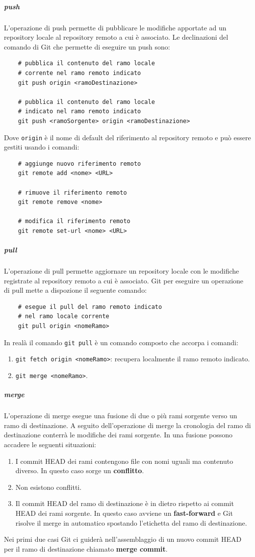 \subparagraph{push}
\label{subpar:push}
L'operazione di push permette di pubblicare le modifiche apportate ad un repository locale al repository remoto a cui è associato.
Le declinazioni del comando di Git che permette di eseguire un push sono:
\begin{lstlisting}
    # pubblica il contenuto del ramo locale 
    # corrente nel ramo remoto indicato
    git push origin <ramoDestinazione> 

    # pubblica il contenuto del ramo locale
    # indicato nel ramo remoto indicato
    git push <ramoSorgente> origin <ramoDestinazione>
\end{lstlisting}   
Dove \texttt{origin} è il nome di default del riferimento al repository remoto e può essere gestiti usando i comandi:
\begin{lstlisting}
    # aggiunge nuovo riferimento remoto
    git remote add <nome> <URL>

    # rimuove il riferimento remoto
    git remote remove <nome>

    # modifica il riferimento remoto
    git remote set-url <nome> <URL>
\end{lstlisting}

\subparagraph{pull}
\label{subpar:pull}
L'operazione di pull permette aggiornare un repository locale con le modifiche registrate al repository remoto a cui è associato.
Git per eseguire un operazione di pull mette a dispozione il seguente comando:
\begin{lstlisting}
    # esegue il pull del ramo remoto indicato
    # nel ramo locale corrente
    git pull origin <nomeRamo>
\end{lstlisting}
In realà il comando \lstinline|git pull| è un comando composto che accorpa i comandi:
\begin{enumerate}
    \item \lstinline|git fetch origin <nomeRamo>|: recupera localmente il ramo remoto indicato.
    \item \lstinline|git merge <nomeRamo>|.
\end{enumerate}

\subparagraph{merge}
\label{subpar:merge}
L'operazione di merge esegue una fusione di due o più rami sorgente verso un ramo di destinazione.
A seguito dell'operazione di merge la cronologia del ramo di destinazione conterrà le modifiche dei rami sorgente.
In una fusione possono accadere le seguenti situazioni:
\begin{enumerate}
    \item I commit HEAD dei rami contengono file con nomi uguali ma contenuto diverso.
    In questo caso sorge un \textbf{conflitto}.

    \item Non esistono conflitti.

    \item Il commit HEAD del ramo di destinazione è in dietro rispetto ai commit HEAD dei rami sorgente.
    In questo caso avviene un \textbf{fast-forward} e Git risolve il merge in automatico spostando l'etichetta del ramo di destinazione.
\end{enumerate}
Nei primi due casi Git ci guiderà nell'assemblaggio di un nuovo commit HEAD per il ramo di destinazione chiamato \textbf{merge commit}.


